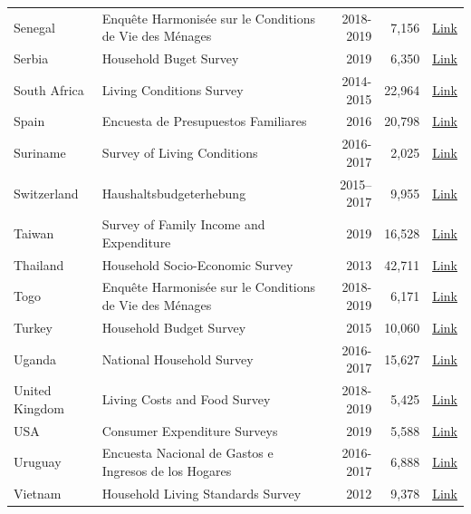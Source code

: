 \begin{ThreePartTable}
\begin{longtable}[t]{l|p{8cm}|r|r|c}
        Senegal & Enquête Harmonisée sur le Conditions de Vie des Ménages & 2018-2019 &  7,156  & \href{https://microdata.worldbank.org/index.php/catalog/4297}{Link} \\ 
        Serbia & Household Buget Survey & 2019 &  6,350  & \href{https://data.stat.gov.rs/?caller=0101\&languageCode=en-US}{Link} \\ 
        South Africa & Living Conditions Survey & 2014-2015 &  22,964  & \href{https://microdata.worldbank.org/index.php/catalog/2882}{Link} \\ 
        Spain & Encuesta de Presupuestos Familiares & 2016 & 20,798 & \href{https://www.ine.es/prensa/epf_prensa.htm}{Link}\\
        Suriname & Survey of Living Conditions & 2016-2017 &  2,025  & \href{https://www.ilo.org/surveyLib/index.php/catalog/7499}{Link} \\ 
        Switzerland & Haushaltsbudgeterhebung & 2015–2017 &  9,955  & \href{https://www.bfs.admin.ch/bfs/de/home/statistiken/wirtschaftliche-soziale-situation-bevoelkerung/erhebungen/habe.html}{Link} \\ 
        Taiwan & Survey of Family Income and Expenditure & 2019 &  16,528  & \href{https://eng.stat.gov.tw/cl.aspx?n=2357}{Link} \\ 
        Thailand & Household Socio-Economic Survey & 2013 &  42,711  & \href{https://www.ilo.org/surveyLib/index.php/catalog/1148}{Link} \\ 
        Togo & Enquête Harmonisée sur le Conditions de Vie des Ménages & 2018-2019 &  6,171  & \href{https://microdata.worldbank.org/index.php/catalog/4298}{Link} \\ 
        Turkey & Household Budget Survey & 2015 &  10,060  & \href{https://data.tuik.gov.tr/Kategori/GetKategori?p=gelir-yasam-tuketim-ve-yoksulluk-107\&dil=2}{Link} \\ 
        Uganda & National Household Survey & 2016-2017 &  15,627  & \href{https://ghdx.healthdata.org/record/uganda-national-household-survey-2016-2017}{Link} \\ 
        United Kingdom & Living Costs and Food Survey & 2018-2019 &  5,425  & \href{https://www.ons.gov.uk/peoplepopulationandcommunity/personalandhouseholdfinances/expenditure/bulletins/familyspendingintheuk/april2018tomarch2019}{Link} \\ 
        USA & Consumer Expenditure Surveys & 2019 &  5,588  & \href{https://www.bls.gov/cex/pumd-getting-started-guide.htm}{Link} \\ 
        Uruguay & Encuesta Nacional de Gastos e Ingresos de los Hogares & 2016-2017 &  6,888  & \href{https://www.ine.gub.uy/web/guest/encuesta-de-gastos-e-ingresos-de-los-hogares-2016}{Link} \\ 
        Vietnam & Household Living Standards Survey & 2012 &  9,378  & \href{https://www.niengiamthongke.net/kh%E1%BA%A3o-s%C3%A1t/vhlss-2020}{Link} \\ 
    \end{longtable}
\end{ThreePartTable}
\endgroup{}